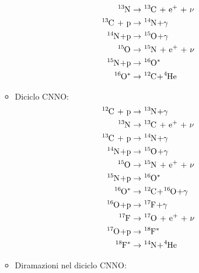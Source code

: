 \documentclass[a4paper,11pt]{article}
\theoremstyle{theorem}
\theoremstyle{definition}
\begin{document}
\begin{itemize}
\begin{itemize}
\begin{align*}
			\tensor[^{13}]{\mathrm{N}}{}&\rightarrow\tensor[^{13}]{\mathrm{C}}{}\textrm{ + e$^+$ + $\nu$}\\
			\tensor[^{13}]{\mathrm{C}}{}\textrm{ + p}&\rightarrow\tensor[^{14}]{\mathrm{N}}{}\mathrm{ + }\gamma\\
			\tensor[^{14}]{\mathrm{N}}{}\mathrm{ + p}&\rightarrow\tensor[^{15}]{\mathrm{O}}{}\mathrm{ + }\gamma\\
			\tensor[^{15}]{\mathrm{O}}{}&\rightarrow\tensor[^{15}]{\mathrm{N}}{}\textrm{ + e$^+$ + $\nu$}\\
			\tensor[^{15}]{\mathrm{N}}{}\mathrm{ + p}&\rightarrow\tensor[^{16}]{\mathrm{O}}{^*}\\
			\tensor[^{16}]{\mathrm{O}}{^*}&\rightarrow\tensor[^{12}]{\mathrm{C}}{}\mathrm{ + }\tensor[^{4}]{\mathrm{He}}{}	
			\end{align*}
			\item Diciclo CNNO:
			\begin{align*}
			\tensor[^{12}]{\mathrm{C}}{}\textrm{ + p}&\rightarrow\tensor[^{13}]{\mathrm{N}}{}\mathrm{ + }\gamma\\
			\tensor[^{13}]{\mathrm{N}}{}&\rightarrow\tensor[^{13}]{\mathrm{C}}{}\textrm{ + e$^+$ + $\nu$}\\
			\tensor[^{13}]{\mathrm{C}}{}\textrm{ + p}&\rightarrow\tensor[^{14}]{\mathrm{N}}{}\mathrm{ + }\gamma\\
			\tensor[^{14}]{\mathrm{N}}{}\mathrm{ + p}&\rightarrow\tensor[^{15}]{\mathrm{O}}{}\mathrm{ + }\gamma\\
			\tensor[^{15}]{\mathrm{O}}{}&\rightarrow\tensor[^{15}]{\mathrm{N}}{}\textrm{ + e$^+$ + $\nu$}\\
			\tensor[^{15}]{\mathrm{N}}{}\mathrm{ + p}&\rightarrow\tensor[^{16}]{\mathrm{O}}{^*}\\
			\tensor[^{16}]{\mathrm{O}}{^*}&\rightarrow\tensor[^{12}]{\mathrm{C}}{}\mathrm{ + }\tensor[^{16}]{\mathrm{O}}{}\mathrm{ + }\gamma\\
			\tensor[^{16}]{\mathrm{O}}{}\mathrm{ + p}&\rightarrow\tensor[^{17}]{\mathrm{F}}{}\mathrm{ + }\gamma\\
			\tensor[^{17}]{\mathrm{F}}{}&\rightarrow\tensor[^{17}]{\mathrm{O}}{}\textrm{ + e$^+$ + $\nu$}\\
			\tensor[^{17}]{\mathrm{O}}{}\mathrm{ + p}&\rightarrow\tensor[^{18}]{\mathrm{F}}{^*}\\
			\tensor[^{18}]{\mathrm{F}}{^*}&\rightarrow\tensor[^{14}]{\mathrm{N}}{}\mathrm{ + }\tensor[^{4}]{\mathrm{He}}{}
			\end{align*}
			\item Diramazioni nel diciclo CNNO:

\end{itemize}
\end{itemize}
\end{document}
